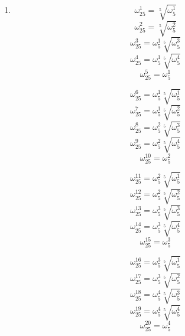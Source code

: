 \documentclass{article}
\begin{document}
\begin{enumerate}
\[ \omega_{24}^{4}=\omega_{6}^{1} \]
\[ \omega_{24}^{5}=\frac{\sqrt{6}-\sqrt{2}+\left( \sqrt{6}+\sqrt{2} \right)i}{4} \]
\[ \omega_{24}^{6}=\omega_{4}^{1} \]

\[ \omega_{24}^{7}=\frac{-\sqrt{6}+\sqrt{2}+\left( \sqrt{6}+\sqrt{2} \right)i}{4} \]
\[ \omega_{24}^{8}=\omega_{3}^{1} \]
\[ \omega_{24}^{9}=\omega_{8}^{3} \]

\[ \omega_{24}^{10}=\omega_{12}^{5} \]
\[ \omega_{24}^{11}=\frac{-\sqrt{6}-\sqrt{2}+\left( \sqrt{6}-\sqrt{2} \right)i}{4} \]
\[ \omega_{24}^{12}=\omega_{2}^{1} \]

\[ \omega_{24}^{13}=\frac{-\sqrt{6}-\sqrt{2}-\left( \sqrt{6}-\sqrt{2} \right)i}{4} \]
\[ \omega_{24}^{14}=\omega_{12}^{7} \]
\[ \omega_{24}^{15}=\omega_{8}^{5} \]

\[ \omega_{24}^{16}=\omega_{3}^{2} \]
\[ \omega_{24}^{17}=\frac{-\sqrt{6}+\sqrt{2}-\left( \sqrt{6}+\sqrt{2} \right)i}{4} \]
\[ \omega_{24}^{18}=\omega_{4}^{3} \]

\[ \omega_{24}^{19}=\frac{\sqrt{6}-\sqrt{2}-\left( \sqrt{6}+\sqrt{2} \right)i}{4} \]
\[ \omega_{24}^{20}=\omega_{6}^{5} \]
\[ \omega_{24}^{21}=\omega_{8}^{7} \]

\[ \omega_{24}^{22}=\omega_{12}^{11} \]
\[ \omega_{24}^{23}=\frac{\sqrt{6}+\sqrt{2}-\left( \sqrt{6}-\sqrt{2} \right)i}{4} \]

\item \[ \omega_{25}^{1}=\sqrt[5]{\omega_{5}^{1}} \]
\[ \omega_{25}^{2}=\sqrt[5]{\omega_{5}^{2}} \]
\[ \omega_{25}^{3}=\omega_{5}^{1}\sqrt[5]{\omega_{5}^{3}} \]
\[ \omega_{25}^{4}=\omega_{5}^{1}\sqrt[5]{\omega_{5}^{4}} \]
\[ \omega_{25}^{5}=\omega_{5}^{1} \]

\[ \omega_{25}^{6}=\omega_{5}^{1}\sqrt[5]{\omega_{5}^{1}} \]
\[ \omega_{25}^{7}=\omega_{5}^{1}\sqrt[5]{\omega_{5}^{2}} \]
\[ \omega_{25}^{8}=\omega_{5}^{2}\sqrt[5]{\omega_{5}^{3}} \]
\[ \omega_{25}^{9}=\omega_{5}^{2}\sqrt[5]{\omega_{5}^{4}} \]
\[ \omega_{25}^{10}=\omega_{5}^{2} \]

\[ \omega_{25}^{11}=\omega_{5}^{2}\sqrt[5]{\omega_{5}^{1}} \]
\[ \omega_{25}^{12}=\omega_{5}^{2}\sqrt[5]{\omega_{5}^{2}} \]
\[ \omega_{25}^{13}=\omega_{5}^{3}\sqrt[5]{\omega_{5}^{3}} \]
\[ \omega_{25}^{14}=\omega_{5}^{3}\sqrt[5]{\omega_{5}^{4}} \]
\[ \omega_{25}^{15}=\omega_{5}^{3} \]

\[ \omega_{25}^{16}=\omega_{5}^{3}\sqrt[5]{\omega_{5}^{1}} \]
\[ \omega_{25}^{17}=\omega_{5}^{3}\sqrt[5]{\omega_{5}^{2}} \]
\[ \omega_{25}^{18}=\omega_{5}^{4}\sqrt[5]{\omega_{5}^{3}} \]
\[ \omega_{25}^{19}=\omega_{5}^{4}\sqrt[5]{\omega_{5}^{4}} \]
\[ \omega_{25}^{20}=\omega_{5}^{4} \]


\end{enumerate}
\end{document}
